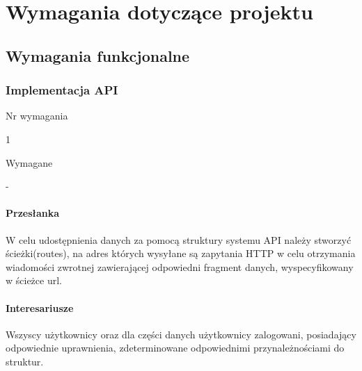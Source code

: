 \documentclass[eng,printmode]{mgr}
\begin{document}
\chapter{Wymagania dotyczące projektu}

\section{Wymagania funkcjonalne}

\subsection{Implementacja API}
\begin{labeling}{Nr wymagania}
\item [Nr wymagania:] 1
\item [Priorytet:] Wymagane
\item [Powiązania:] -
\end{labeling}

\subsubsection{Przesłanka}
W celu udostępnienia danych za pomocą struktury systemu API należy stworzyć ścieżki(routes), na adres których wysyłane są zapytania HTTP w celu otrzymania wiadomości zwrotnej zawierającej odpowiedni fragment danych, wyspecyfikowany w ścieżce url.

\subsubsection{Interesariusze}
Wszyscy użytkownicy oraz dla części danych użytkownicy zalogowani, posiadający odpowiednie uprawnienia, zdeterminowane odpowiednimi przynależnościami do struktur.
\end{document}
